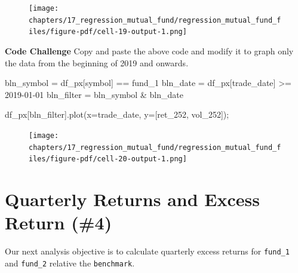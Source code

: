 \documentclass[
  letterpaper,
  DIV=11,
  numbers=noendperiod]{scrreprt}
\newenvironment{Shaded}{\begin{snugshade}}{\end{snugshade}}
\newcommand{\NormalTok}[1]{\textcolor[rgb]{0.00,0.23,0.31}{#1}}
\newcommand{\OperatorTok}[1]{\textcolor[rgb]{0.37,0.37,0.37}{#1}}
\newcommand{\StringTok}[1]{\textcolor[rgb]{0.13,0.47,0.30}{#1}}
\begin{document}
\begin{figure}[H]

{\centering \texttt{[image: chapters/17\_regression\_mutual\_fund/regression\_mutual\_fund\_files/figure-pdf/cell-19-output-1.png]}

}

\end{figure}

\textbf{Code Challenge} Copy and paste the above code and modify it to
graph only the data from the beginning of 2019 and onwards.

\begin{Shaded}
\begin{Highlighting}[]
\NormalTok{bln\_symbol }\OperatorTok{=}\NormalTok{ df\_px[}\StringTok{\textquotesingle{}symbol\textquotesingle{}}\NormalTok{] }\OperatorTok{==} \StringTok{\textquotesingle{}fund\_1\textquotesingle{}}
\NormalTok{bln\_date }\OperatorTok{=}\NormalTok{ df\_px[}\StringTok{\textquotesingle{}trade\_date\textquotesingle{}}\NormalTok{] }\OperatorTok{\textgreater{}=} \StringTok{\textquotesingle{}2019{-}01{-}01\textquotesingle{}}
\NormalTok{bln\_filter }\OperatorTok{=}\NormalTok{ bln\_symbol }\OperatorTok{\&}\NormalTok{ bln\_date}

\NormalTok{df\_px[bln\_filter].plot(x}\OperatorTok{=}\StringTok{\textquotesingle{}trade\_date\textquotesingle{}}\NormalTok{, y}\OperatorTok{=}\NormalTok{[}\StringTok{\textquotesingle{}ret\_252\textquotesingle{}}\NormalTok{, }\StringTok{\textquotesingle{}vol\_252\textquotesingle{}}\NormalTok{])}\OperatorTok{;}
\end{Highlighting}
\end{Shaded}

\begin{figure}[H]

{\centering \texttt{[image: chapters/17\_regression\_mutual\_fund/regression\_mutual\_fund\_files/figure-pdf/cell-20-output-1.png]}

}

\end{figure}

\hypertarget{quarterly-returns-and-excess-return-4}{%
\section{Quarterly Returns and Excess Return
(\#4)}\label{quarterly-returns-and-excess-return-4}}

Our next analysis objective is to calculate quarterly excess returns for
\texttt{fund\_1} and \texttt{fund\_2} relative the \texttt{benchmark}.
\end{document}
